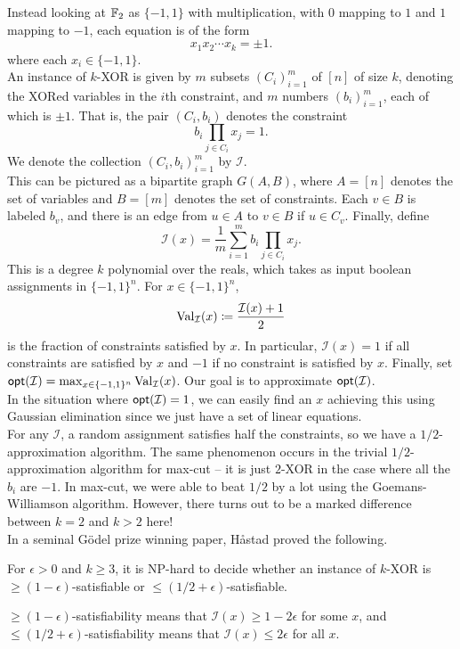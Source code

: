 	Instead looking at $\mathbb{F}_2$ as $\{-1,1\}$ with multiplication, with $0$ mapping to $1$ and $1$ mapping to $-1$, each equation is of the form
	\[ x_1 x_2 \cdots x_k = \pm 1. \]
	where each $x_i \in \{-1,1\}$.\\
	An instance of $k$-XOR is given by $m$ subsets $(C_i)_{i=1}^m$ of $[n]$ of size $k$, denoting the XORed variables in the $i$th constraint, and $m$ numbers $(b_i)_{i=1}^m$, each of which is $\pm 1$. That is, the pair $(C_i,b_i)$ denotes the constraint
	\[ b_i \prod_{j \in C_i} x_j = 1. \]
	We denote the collection $(C_i,b_i)_{i=1}^m$ by $\mathcal{I}$.\\
	This can be pictured as a bipartite graph $G(A,B)$, where $A = [n]$ denotes the set of variables and $B = [m]$ denotes the set of constraints. Each $v \in B$ is labeled $b_v$, and there is an edge from $u \in A$ to $v \in B$ if $u \in C_v$. Finally, define
	\[ \mathcal{I}(x) = \frac{1}{m} \sum_{i=1}^m b_i \prod_{j \in C_i} x_j. \]
	This is a degree $k$ polynomial over the reals, which takes as input boolean assignments in $\{-1,1\}^n$. For $x \in \{-1,1\}^n$,
	\[ \operatorname{Val}_\mathcal{I}(x) \coloneqq \frac{\mathcal{I}(x)+1}{2} \]
	is the fraction of constraints satisfied by $x$. In particular, $\mathcal{I}(x) = 1$ if all constraints are satisfied by $x$ and $-1$ if no constraint is satisfied by $x$. Finally, set $\mathsf{opt}(\mathcal{I}) = \max_{x \in \{-1,1\}^n} \operatorname{Val}_\mathcal{I}(x)$. Our goal is to approximate $\mathsf{opt}(\mathcal{I})$.\\
	In the situation where $\mathsf{opt}(\mathcal{I}) = 1$, we can easily find an $x$ achieving this using Gaussian elimination since we just have a set of linear equations.\\
	For any $\mathcal{I}$, a random assignment satisfies half the constraints, so we have a $1/2$-approximation algorithm. The same phenomenon occurs in the trivial $1/2$-approximation algorithm for max-cut -- it is just $2$-XOR in the case where all the $b_i$ are $-1$. In max-cut, we were able to beat $1/2$ by a lot using the Goemans-Williamson algorithm. However, there turns out to be a marked difference between $k=2$ and $k>2$ here!\\
	In a seminal G\"{o}del prize winning paper, H\r{a}stad \cite{hastad-appx-3sat} proved the following.

	\begin{ftheo}[H\r{a}stad]
		For $\epsilon > 0$ and $k \ge 3$, it is \textsf{NP}-hard to decide whether an instance of $k$-XOR is $\ge (1-\epsilon)$-satisfiable or $\le (1/2 + \epsilon)$-satisfiable.
	\end{ftheo}
	$\ge (1-\epsilon)$-satisfiability means that $\mathcal{I}(x) \ge 1-2\epsilon$ for some $x$, and $\le (1/2 + \epsilon)$-satisfiability means that $\mathcal{I}(x) \le 2\epsilon$ for all $x$.

